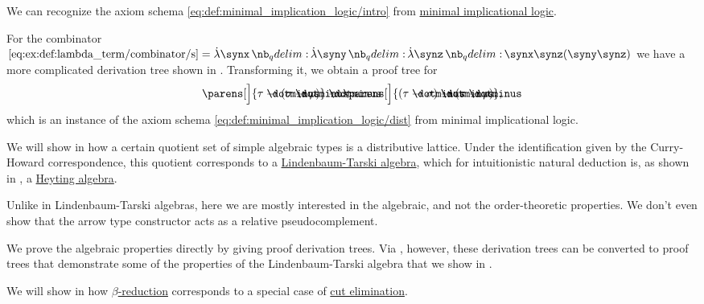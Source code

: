 \begin{example}
\begin{thmenum}
    We can recognize the axiom schema \eqref{eq:def:minimal_implication_logic/intro} from \hyperref[def:minimal_implication_logic]{minimal implicational logic}.

    For the combinator \( \ref{eq:ex:def:lambda_term/combinator/s} = \qabs \synx \qabs \syny \qabs \synz \synx \synz (\syny \synz) \) we have a more complicated derivation tree shown in . Transforming it, we obtain a proof tree for
    \begin{equation*}
      \parens[\Big]{ \tau \synimplies (\sigma \synimplies \rho) } \synimplies \parens[\Big]{ (\tau \synimplies \sigma) \synimplies (\tau \synimplies \rho)},
    \end{equation*}
    which is an instance of the axiom schema \eqref{eq:def:minimal_implication_logic/dist} from minimal implicational logic.

     We will show in  how a certain quotient set of simple algebraic types is a distributive lattice. Under the identification given by the Curry-Howard correspondence, this quotient corresponds to a \hyperref[def:lindenbaum_tarski_algebra]{Lindenbaum-Tarski algebra}, which for intuitionistic natural deduction is, as shown in , a \hyperref[def:heyting_algebra]{Heyting algebra}.

    Unlike in Lindenbaum-Tarski algebras, here we are mostly interested in the algebraic, and not the order-theoretic properties. We don't even show that the arrow type constructor acts as a relative pseudocomplement.

    We prove the algebraic properties directly by giving proof derivation trees. Via , however, these derivation trees can be converted to proof trees that demonstrate some of the properties of the Lindenbaum-Tarski algebra that we show in .

     We will show in  how \hyperref[def:beta_eta_reduction]{\( \beta \)-reduction} corresponds to a special case of \hyperref[rem:sequent_calculus]{cut elimination}.
  \end{thmenum}
\end{example}
